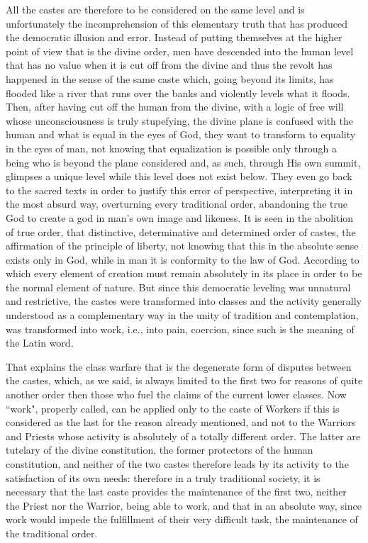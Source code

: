 All the castes are therefore to be considered on the same level and is unfortunately the incomprehension of this elementary truth that has produced the democratic illusion and error. Instead of putting themselves at the higher point of view that is the divine order, men have descended into the human level that has no value when it is cut off from the divine and thus the revolt has happened in the sense of the same caste which, going beyond its limits, has flooded like a river that runs over the banks and violently levels what it floods. Then, after having cut off the human from the divine, with a logic of free will whose unconsciousness is truly stupefying, the divine plane is confused with the human and what is equal in the eyes of God, they want to transform to equality in the eyes of man, not knowing that equalization is possible only through a being who is beyond the plane considered and, as such, through His own summit, glimpses a unique level while this level does not exist below. They even go back to the sacred texts in order to justify this error of perspective, interpreting it in the most absurd way, overturning every traditional order, abandoning the true God to create a god in man's own image and likeness. It is seen in the abolition of true order, that distinctive, determinative and determined order of castes, the affirmation of the principle of liberty, not knowing that this in the absolute sense exists only in God, while in man it is conformity to the law of God. According to which every element of creation must remain absolutely in its place in order to be the normal element of nature. But since this democratic leveling was unnatural and restrictive, the castes were transformed into classes and the activity generally understood as a complementary way in the unity of tradition and contemplation, was transformed into work, i.e., into pain, coercion, since such is the meaning of the Latin word.

That explains the class warfare that is the degenerate form of disputes between the castes, which, as we said, is always limited to the first two for reasons of quite another order then those who fuel the claims of the current lower classes. Now ``work", properly called, can be applied only to the caste of Workers if this is considered as the last for the reason already mentioned, and not to the Warriors and Priests whose activity is absolutely of a totally different order. The latter are tutelary of the divine constitution, the former protectors of the human constitution, and neither of the two castes therefore leads by its activity to the satisfaction of its own needs: therefore in a truly traditional society, it is necessary that the last caste provides the maintenance of the first two, neither the Priest nor the Warrior, being able to work, and that in an absolute way, since work would impede the fulfillment of their very difficult task, the maintenance of the traditional order.

